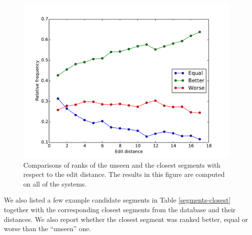 \begin{figure}
    \begin{center}
        \includegraphics[width=14cm]{img/per-distance.pdf}
    \end{center}

    \caption[Comparisons of unseen and the closest systems with respect to the
    edit distance]{Comparisons of ranks of the unseen and the closest segments
        with respect to the edit distance. The results in this figure are
        computed on all of the systems.}

    \label{better-worse-equal-with-edit-distance}
\end{figure}




We also listed a few example candidate segments in Table
\ref{segments-closest} together with the corresponding closest segments from
the database and their distances. We also report whether the closest segment
was ranked better, equal or worse than the ``unseen'' one.

